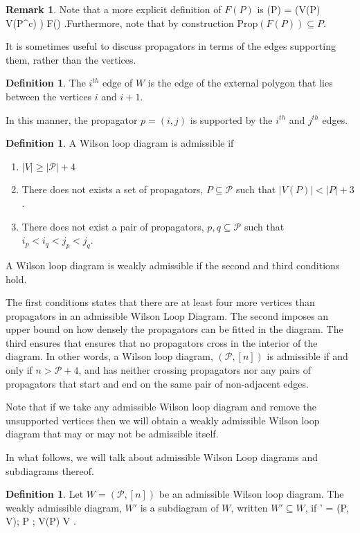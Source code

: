 \documentclass[11pt]{article}
\def\bas #1\eas{\begin{align*} #1 \end{align*}}
\newcommand{\cP}{\mathcal{P}}
\newcommand{\Prop}{\textrm{Prop}}
\theoremstyle{remark}
\theoremstyle{definition}
\newtheorem{dfn}[thm]{Definition}
\newtheorem{rmk}[thm]{Remark}
\begin{document}
\begin{rmk}\label{alt F(P) rmk}
Note that a more explicit definition of $F(P)$ is \bas F(P)  = \big(V(P) \setminus V(P^c) \big) \cup F(\emptyset) \;.\eas Furthermore, note that by construction $\Prop(F(P)) \subseteq P$.  
\end{rmk}

It is sometimes useful to discuss propagators in terms of the edges supporting them, rather than the vertices.

\begin{dfn}
The $i^{th}$ edge of $W$ is the edge of the external polygon that lies between the vertices $i$ and $i+1$.
\end{dfn}

In this manner, the propagator $p = (i, j)$ is supported by the $i^{th}$ and $j^{th}$ edges.

\begin{dfn}\label{admisdfn}
A Wilson loop diagram is admissible if \begin{enumerate}
\item $|V| \geq |\cP| + 4$
\item There does not exists a set of propagators, $P \subseteq \cP$ such that $|V(P)| < |P| + 3$.
\item There does not exist a pair of propagators, $p, q \subseteq \cP$ such that $i_p < i_q < j_p <j_q$.
\end{enumerate}
A Wilson loop diagram is weakly admissible if the second and third conditions hold.
 \end{dfn}

The first conditions states that there are at least four more vertices than propagators in an admissible Wilson Loop Diagram. The second imposes an upper bound on how densely the propagators can be fitted in the diagram. The third ensures that ensures that no propagators cross in the interior of the diagram. In other words, a Wilson loop diagram, $(\cP, [n])$ is admissible if and only if $n > \cP +4$, and has neither crossing propagators nor any pairs of propagators that start and end on the same pair of non-adjacent edges.

Note that if we take any admissible Wilson loop diagram and remove the unsupported vertices then we will obtain a weakly admissible Wilson loop diagram that may or may not be admissible itself.

In what follows, we will talk about admissible Wilson Loop diagrams and subdiagrams thereof.

\begin{dfn} \label{subdiagramdfn}
Let $W = (\cP, [n])$ be an admissible Wilson loop diagram. The weakly admissible diagram, $W'$ is a subdiagram of $W$, written $W' \subseteq W$, if \bas W' = (P, V); \quad P \subseteq \cP ; \quad V(P) \subseteq V \subseteq [n]\;.\eas
\end{dfn}
\end{document}
